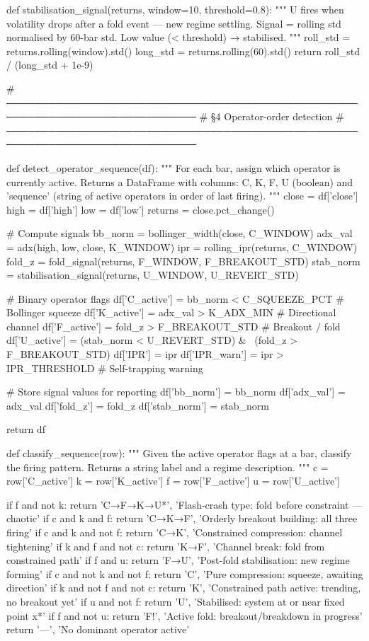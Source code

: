 {def stabilisation_signal(returns, window=10, threshold=0.8):
    """
    U fires when volatility drops after a fold event — new regime settling.
    Signal = rolling std normalised by 60-bar std.
    Low value (< threshold) → stabilised.
    """
    roll_std = returns.rolling(window).std()
    long_std = returns.rolling(60).std()
    return roll_std / (long_std + 1e-9)

# ─────────────────────────────────────────────────────────────────────────────
# §4  Operator-order detection
# ─────────────────────────────────────────────────────────────────────────────

def detect_operator_sequence(df):
    """
    For each bar, assign which operator is currently active.
    Returns a DataFrame with columns: C, K, F, U (boolean) and
    'sequence' (string of active operators in order of last firing).
    """
    close   = df['close']
    high    = df['high']
    low     = df['low']
    returns = close.pct_change()

    # Compute signals
    bb_norm   = bollinger_width(close, C_WINDOW)
    adx_val   = adx(high, low, close, K_WINDOW)
    ipr       = rolling_ipr(returns, C_WINDOW)
    fold_z    = fold_signal(returns, F_WINDOW, F_BREAKOUT_STD)
    stab_norm = stabilisation_signal(returns, U_WINDOW, U_REVERT_STD)

    # Binary operator flags
    df['C_active'] = bb_norm < C_SQUEEZE_PCT          # Bollinger squeeze
    df['K_active'] = adx_val > K_ADX_MIN              # Directional channel
    df['F_active'] = fold_z  > F_BREAKOUT_STD         # Breakout / fold
    df['U_active'] = (stab_norm < U_REVERT_STD) & ~(fold_z > F_BREAKOUT_STD)
    df['IPR']      = ipr
    df['IPR_warn'] = ipr > IPR_THRESHOLD               # Self-trapping warning

    # Store signal values for reporting
    df['bb_norm']   = bb_norm
    df['adx_val']   = adx_val
    df['fold_z']    = fold_z
    df['stab_norm'] = stab_norm

    return df

def classify_sequence(row):
    """
    Given the active operator flags at a bar, classify the firing pattern.
    Returns a string label and a regime description.
    """
    c = row['C_active']
    k = row['K_active']
    f = row['F_active']
    u = row['U_active']

    if f and not k:
        return 'C→F→K→U*', 'Flash-crash type: fold before constraint — chaotic'
    if c and k and f:
        return 'C→K→F',    'Orderly breakout building: all three firing'
    if c and k and not f:
        return 'C→K',      'Constrained compression: channel tightening'
    if k and f and not c:
        return 'K→F',      'Channel break: fold from constrained path'
    if f and u:
        return 'F→U',      'Post-fold stabilisation: new regime forming'
    if c and not k and not f:
        return 'C',        'Pure compression: squeeze, awaiting direction'
    if k and not f and not c:
        return 'K',        'Constrained path active: trending, no breakout yet'
    if u and not f:
        return 'U',        'Stabilised: system at or near fixed point x*'
    if f and not u:
        return 'F!',       'Active fold: breakout/breakdown in progress'
    return '—',            'No dominant operator active'

}
